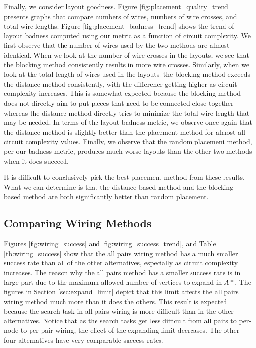 Finally, we consider layout goodness. Figure
\ref{fig:placement_quality_trend} presents graphs that compare numbers of wires,
numbers of wire crosses, and total wire lengths.
Figure \ref{fig:placement_badness_trend} shows the trend of layout badness
computed using our metric as a function of circuit complexity.
We first observe that the
number of wires used by the two methods are almost identical. When
we look at the number of wire crosses in the layouts, we
see that the blocking method consistently results in more wire crosses.
Similarly,
when we look at the total length of wires used in the layouts, the blocking
method exceeds the distance method consistently, with the difference getting
higher as circuit complexity increases.
This is somewhat expected because the blocking method does not directly aim to
put pieces that need to be connected close together whereas the distance method
directly tries to minimize the total wire length that may be needed. In terms
of the layout badness metric, we observe once again that the distance method
is slightly better than the placement method for almost all circuit complexity
values. Finally, we observe that the random
placement method, per our badness metric, produces much worse layouts than the
other two methods when it does succeed.

It is difficult to conclusively pick the best placement method from these
results. What we can determine is that the distance based method and the
blocking based method are both significantly better than random placement.

\subsection{Comparing Wiring Methods}

Figures \ref{fig:wiring_success} and \ref{fig:wiring_success_trend}, and Table
\ref{tb:wiring_success} show that the all pairs wiring method has a much smaller
success rate than all of
the other alternatives, especially as circuit complexity increases. The reason
why the all pairs method has a smaller success rate is in
large part due to the maximum allowed number of vertices to expand in $A*$. The
figures in Section \ref{sec:expand_limit} depict that this limit affects
the all pairs wiring method much more than it does the others. This result is
expected because the search task in all pairs wiring is more difficult than in
the other alternatives. Notice that as the search tasks get less difficult from
all pairs to per-node to per-pair wiring, the effect of the expanding limit
decreases. The other four alternatives have very comparable success rates.

